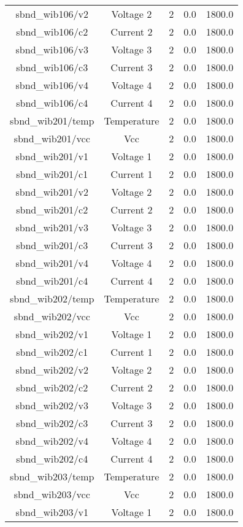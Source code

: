 \begin{center}
\begin{longtable}{c | c c c c }
sbnd\_wib106/v2 & Voltage 2 & 2 & 0.0 & 1800.0\\ 
sbnd\_wib106/c2 & Current 2 & 2 & 0.0 & 1800.0\\ 
sbnd\_wib106/v3 & Voltage 3 & 2 & 0.0 & 1800.0\\ 
sbnd\_wib106/c3 & Current 3 & 2 & 0.0 & 1800.0\\ 
sbnd\_wib106/v4 & Voltage 4 & 2 & 0.0 & 1800.0\\ 
sbnd\_wib106/c4 & Current 4 & 2 & 0.0 & 1800.0\\ 
sbnd\_wib201/temp & Temperature & 2 & 0.0 & 1800.0\\ 
sbnd\_wib201/vcc & Vcc & 2 & 0.0 & 1800.0\\ 
sbnd\_wib201/v1 & Voltage 1 & 2 & 0.0 & 1800.0\\ 
sbnd\_wib201/c1 & Current 1 & 2 & 0.0 & 1800.0\\ 
sbnd\_wib201/v2 & Voltage 2 & 2 & 0.0 & 1800.0\\ 
sbnd\_wib201/c2 & Current 2 & 2 & 0.0 & 1800.0\\ 
sbnd\_wib201/v3 & Voltage 3 & 2 & 0.0 & 1800.0\\ 
sbnd\_wib201/c3 & Current 3 & 2 & 0.0 & 1800.0\\ 
sbnd\_wib201/v4 & Voltage 4 & 2 & 0.0 & 1800.0\\ 
sbnd\_wib201/c4 & Current 4 & 2 & 0.0 & 1800.0\\ 
sbnd\_wib202/temp & Temperature & 2 & 0.0 & 1800.0\\ 
sbnd\_wib202/vcc & Vcc & 2 & 0.0 & 1800.0\\ 
sbnd\_wib202/v1 & Voltage 1 & 2 & 0.0 & 1800.0\\ 
sbnd\_wib202/c1 & Current 1 & 2 & 0.0 & 1800.0\\ 
sbnd\_wib202/v2 & Voltage 2 & 2 & 0.0 & 1800.0\\ 
sbnd\_wib202/c2 & Current 2 & 2 & 0.0 & 1800.0\\ 
sbnd\_wib202/v3 & Voltage 3 & 2 & 0.0 & 1800.0\\ 
sbnd\_wib202/c3 & Current 3 & 2 & 0.0 & 1800.0\\ 
sbnd\_wib202/v4 & Voltage 4 & 2 & 0.0 & 1800.0\\ 
sbnd\_wib202/c4 & Current 4 & 2 & 0.0 & 1800.0\\ 
sbnd\_wib203/temp & Temperature & 2 & 0.0 & 1800.0\\ 
sbnd\_wib203/vcc & Vcc & 2 & 0.0 & 1800.0\\ 
sbnd\_wib203/v1 & Voltage 1 & 2 & 0.0 & 1800.0\\ 

\end{longtable}
\end{center}
